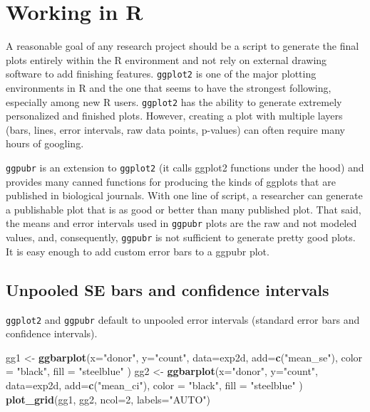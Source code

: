 \documentclass[]{book}
\newenvironment{Shaded}{\begin{snugshade}}{\end{snugshade}}
\newcommand{\KeywordTok}[1]{\textcolor[rgb]{0.13,0.29,0.53}{\textbf{#1}}}
\newcommand{\DataTypeTok}[1]{\textcolor[rgb]{0.13,0.29,0.53}{#1}}
\newcommand{\DecValTok}[1]{\textcolor[rgb]{0.00,0.00,0.81}{#1}}
\newcommand{\StringTok}[1]{\textcolor[rgb]{0.31,0.60,0.02}{#1}}
\newcommand{\NormalTok}[1]{#1}
\begin{document}
\section{Working in R}\label{working-in-r-3}

A reasonable goal of any research project should be a script to generate
the final plots entirely within the R environment and not rely on
external drawing software to add finishing features. \texttt{ggplot2} is
one of the major plotting environments in R and the one that seems to
have the strongest following, especially among new R users.
\texttt{ggplot2} has the ability to generate extremely personalized and
finished plots. However, creating a plot with multiple layers (bars,
lines, error intervals, raw data points, p-values) can often require
many hours of googling.

\texttt{ggpubr} is an extension to \texttt{ggplot2} (it calls ggplot2
functions under the hood) and provides many canned functions for
producing the kinds of ggplots that are published in biological
journals. With one line of script, a researcher can generate a
publishable plot that is as good or better than many published plot.
That said, the means and error intervals used in \texttt{ggpubr} plots
are the raw and not modeled values, and, consequently, \texttt{ggpubr}
is not sufficient to generate pretty good plots. It is easy enough to
add custom error bars to a ggpubr plot.

\subsection{Unpooled SE bars and confidence
intervals}\label{unpooled-se-bars-and-confidence-intervals}

\texttt{ggplot2} and \texttt{ggpubr} default to unpooled error intervals
(standard error bars and confidence intervals).

\begin{Shaded}
\begin{Highlighting}[]
\NormalTok{gg1 <-}\StringTok{ }\KeywordTok{ggbarplot}\NormalTok{(}\DataTypeTok{x=}\StringTok{"donor"}\NormalTok{, }
                 \DataTypeTok{y=}\StringTok{"count"}\NormalTok{, }
                 \DataTypeTok{data=}\NormalTok{exp2d,}
                 \DataTypeTok{add=}\KeywordTok{c}\NormalTok{(}\StringTok{"mean_se"}\NormalTok{),}
                 \DataTypeTok{color =} \StringTok{"black"}\NormalTok{,}
                 \DataTypeTok{fill =} \StringTok{"steelblue"}
\NormalTok{)}
\NormalTok{gg2 <-}\StringTok{ }\KeywordTok{ggbarplot}\NormalTok{(}\DataTypeTok{x=}\StringTok{"donor"}\NormalTok{, }
                 \DataTypeTok{y=}\StringTok{"count"}\NormalTok{, }
                 \DataTypeTok{data=}\NormalTok{exp2d,}
                 \DataTypeTok{add=}\KeywordTok{c}\NormalTok{(}\StringTok{"mean_ci"}\NormalTok{),}
                 \DataTypeTok{color =} \StringTok{"black"}\NormalTok{,}
                 \DataTypeTok{fill =} \StringTok{"steelblue"}
\NormalTok{)}
\KeywordTok{plot_grid}\NormalTok{(gg1, gg2, }\DataTypeTok{ncol=}\DecValTok{2}\NormalTok{, }\DataTypeTok{labels=}\StringTok{"AUTO"}\NormalTok{)}
\end{Highlighting}
\end{Shaded}
\end{document}

